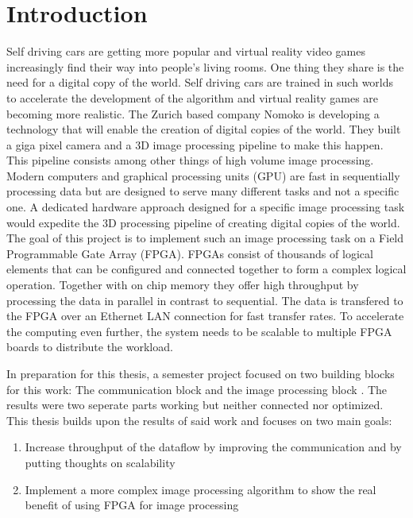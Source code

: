 
%
%
\chapter{Introduction}
Self driving cars are getting more popular and virtual reality video games
increasingly find their way into people's living rooms. One thing they share is
the need for a digital copy of the world. Self driving cars are trained in such
worlds to
accelerate the development of the algorithm and virtual reality games are
becoming more realistic. The Zurich based company Nomoko \cite{nomoko} is developing a
technology that will enable the creation of digital copies of the world. They
built a giga pixel camera and a 3D image processing pipeline to make this happen. This pipeline
consists among other things of high volume image processing. Modern computers
and graphical processing units (GPU) are fast in sequentially processing data
but are designed to serve many different tasks and not a specific one. A
dedicated hardware approach designed for a specific image processing task would
expedite the 3D processing pipeline of creating digital copies of the world.
\\

The goal of this project is to implement such an image processing task on a
Field
Programmable Gate Array (FPGA). FPGAs
consist of thousands of logical elements that can be configured and connected
together to form a complex logical operation. Together with on chip
memory they offer high throughput by processing the data in parallel in contrast to
sequential. The data is transfered to the FPGA over an Ethernet LAN connection
for
fast transfer rates. To accelerate the computing even further, the system needs
to be scalable to multiple FPGA boards to distribute the workload.

In preparation for this thesis, a semester project focused on two building
blocks for this work: The communication block and the image processing block
\cite{p5report}. The results were two seperate parts working but neither
connected nor optimized. This thesis builds upon the results of said work and
focuses on two main goals:

\clearpage
\begin{enumerate}
    \item Increase throughput of the dataflow by improving the communication and
    by putting thoughts on scalability
    \item Implement a more complex image processing algorithm to show the real
    benefit of using FPGA for image processing
\end{enumerate}
%     


